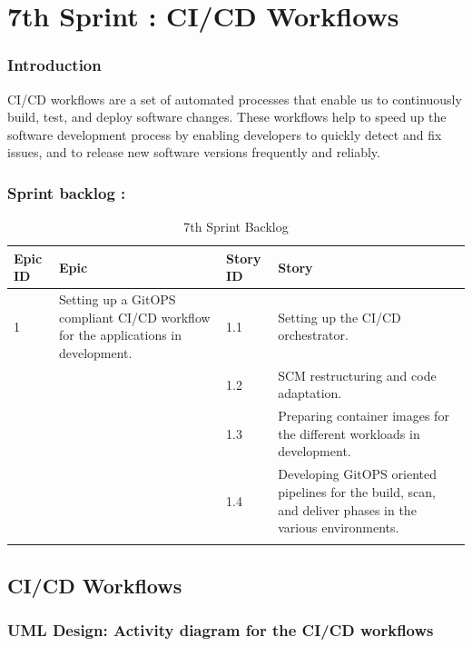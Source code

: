 \graphicspath{{./assets/}}
\setcounter{mtc}{9}
\chapter{7th Sprint : CI/CD Workflows }

\minitoc

\subsection*{Introduction}
CI/CD workflows are a set of automated processes that enable us to continuously build, test, and deploy software changes. These workflows help to speed up the software development process by enabling developers to quickly detect and fix issues, and to release new software versions frequently and reliably. 


\subsection{Sprint backlog :}

\begin{longtable}[H]{|m{1.5cm}|m{3cm}|m{1.5cm}|m{9cm}|}
\hline
{\textbf{Epic ID}} & {\textbf{Epic}} & {\textbf{Story ID}} & {\textbf{Story}}\\
\hline
1  & Setting up a GitOPS compliant CI/CD workflow for the applications in development.  &  1.1	 & Setting up the CI/CD orchestrator.\\
\cline{3-4}
& & 1.2 & SCM restructuring and code adaptation. \\
\cline{3-4}
& & 1.3	& Preparing container images for the different workloads in development.  \\
\cline{3-4}
& & 1.4	& Developing GitOPS oriented pipelines for the build, scan, and deliver phases in the various environments.  \\
\cline{3-4}
\hline
\caption{7th Sprint Backlog}
\end{longtable}

\section{CI/CD Workflows}

\subsection{UML Design: Activity diagram for the CI/CD workflows } 

